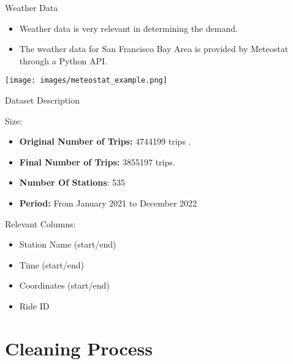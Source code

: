 \documentclass[
  ignorenonframetext,
]{beamer}
\providecommand{\tightlist}{%
  \setlength{\itemsep}{0pt}\setlength{\parskip}{0pt}}
\begin{document}
\begin{frame}{Weather Data}
\protect\hypertarget{weather-data}{}
\begin{itemize}
\tightlist
\item
  Weather data is very relevant in determining the demand.
\item
  The weather data for San Francisco Bay Area is provided by Meteostat
  through a Python API.
\end{itemize}

\texttt{[image: images/meteostat\_example.png]}
\end{frame}

\begin{frame}{Dataset Description}
\protect\hypertarget{dataset-description}{}
\begin{block}{Size:}
\protect\hypertarget{size}{}
\begin{itemize}
\tightlist
\item
  \textbf{Original Number of Trips:} 4744199 trips .
\item
  \textbf{Final Number of Trips:} 3855197 trips.
\item
  \textbf{Number Of Stations}: 535
\item
  \textbf{Period:} From January 2021 to December 2022
\end{itemize}
\end{block}

\begin{block}{Relevant Columns:}
\protect\hypertarget{relevant-columns}{}
\begin{itemize}
\tightlist
\item
  Station Name (start/end)
\item
  Time (start/end)
\item
  Coordinates (start/end)
\item
  Ride ID
\end{itemize}
\end{block}
\end{frame}

\hypertarget{cleaning-process}{%
\section{Cleaning Process}\label{cleaning-process}}
\end{document}
